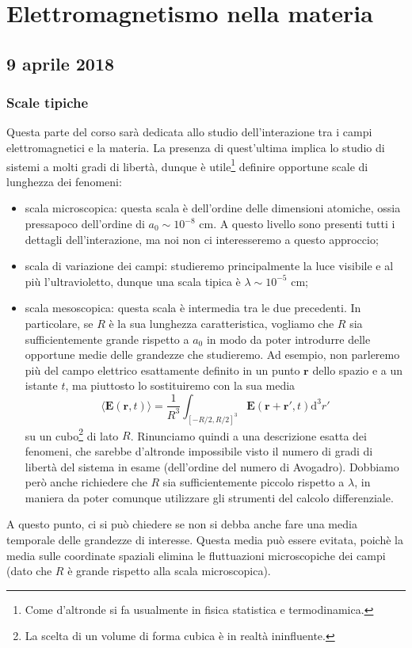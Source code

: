 \documentclass[a4paper,11pt]{book}
\renewcommand{\d}{\mathrm{d}}
\renewcommand{\vec}[1]{\mathbf{#1}}
\theoremstyle{theorem}
\theoremstyle{definition}
\begin{document}
\chapter{Elettromagnetismo nella materia}
\section{9 aprile 2018}
\subsection{Scale tipiche}
Questa parte del corso sarà dedicata allo studio dell'interazione tra i campi elettromagnetici e la materia. La presenza di quest'ultima implica lo studio di sistemi a molti gradi di libertà, dunque è utile\footnote{Come d'altronde si fa usualmente in fisica statistica e termodinamica.} definire opportune scale di lunghezza dei fenomeni:
\begin{itemize}
	\item scala microscopica: questa scala è dell'ordine delle dimensioni atomiche, ossia pressapoco dell'ordine di $a_0\sim10^{-8}$ cm. A questo livello sono presenti tutti i dettagli dell'interazione, ma noi non ci interesseremo a questo approccio;
	\item scala di variazione dei campi: studieremo principalmente la luce visibile e al più l'ultravioletto, dunque una scala tipica è $\lambda\sim 10^{-5}$ cm;
	\item scala mesoscopica: questa scala è intermedia tra le due precedenti. In particolare, se $R$ è la sua lunghezza caratteristica, vogliamo che $R$ sia sufficientemente grande rispetto a $a_0$ in modo da poter introdurre delle opportune medie delle grandezze che studieremo. Ad esempio, non parleremo più del campo elettrico esattamente definito in un punto $\vec{r}$ dello spazio e a un istante $t$, ma piuttosto lo sostituiremo con la sua media
	\[\langle\vec{E}(\vec{r},t)\rangle=\frac{1}{R^3}\int_{[-R/2,R/2]^3}\vec{E}(\vec{r}+\vec{r}',t)\d^3r'\]
	su un cubo\footnote{La scelta di un volume di forma cubica è in realtà ininfluente.} di lato $R$. Rinunciamo quindi a una descrizione esatta dei fenomeni, che sarebbe d'altronde impossibile visto il numero di gradi di libertà del sistema in esame (dell'ordine del numero di Avogadro). Dobbiamo però anche richiedere che $R$ sia sufficientemente piccolo rispetto a $\lambda$, in maniera da poter comunque utilizzare gli strumenti del calcolo differenziale.
\end{itemize}
 A questo punto, ci si può chiedere se non si debba anche fare una media temporale delle grandezze di interesse. Questa media può essere evitata, poichè la media sulle coordinate spaziali elimina le fluttuazioni microscopiche dei campi (dato che $R$ è grande rispetto alla scala microscopica).
\end{document}
